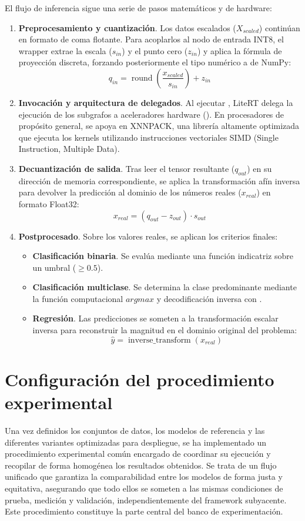 \documentclass[a4paper,12pt,twoside,final]{book}
\begin{document}
El flujo de inferencia sigue una serie de pasos matemáticos y de hardware:
\begin{enumerate}
  \item \textbf{Preprocesamiento y cuantización}. Los datos escalados ($X_{scaled}$) continúan en formato de coma
  flotante. Para acoplarlos al nodo de entrada INT8, el wrapper extrae la escala ($s_{in}$) y el punto cero ($z_{in}$)
  y aplica la fórmula de proyección discreta, forzando posteriormente el tipo numérico a  de NumPy:
  \[
  q_{in} = \operatorname{round}\left(\frac{x_{scaled}}{s_{in}}\right) + z_{in}
  \]
  \item \textbf{Invocación y arquitectura de delegados}. Al ejecutar , LiteRT delega la ejecución de los
  subgrafos a aceleradores hardware (). En procesadores de propósito general, se apoya en XNNPACK, una
  librería altamente optimizada que ejecuta los kernels utilizando instrucciones vectoriales SIMD
  (Single Instruction, Multiple Data).
  \item \textbf{Decuantización de salida}. Tras leer el tensor resultante ($q_{out}$) en su dirección de memoria
  correspondiente, se aplica la transformación afín inversa para devolver la predicción al dominio de los números
  reales ($x_{real}$) en formato Float32:
  \[
  x_{real} = (q_{out} - z_{out}) \cdot s_{out}
  \]
  \item \textbf{Postprocesado}. Sobre los valores reales, se aplican los criterios finales:
  \begin{itemize}
    \item \textbf{Clasificación binaria}. Se evalúa mediante una función indicatriz sobre un umbral ($\ge 0.5$).
    \item \textbf{Clasificación multiclase}. Se determina la clase predominante mediante la función computacional
    $argmax$ y decodificación inversa con .
    \item \textbf{Regresión}. Las predicciones se someten a la transformación escalar inversa para reconstruir la
    magnitud en el dominio original del problema:
    \[
    \hat{y} = \operatorname{inverse\_transform}(x_{real})
    \]
  \end{itemize}
\end{enumerate}

\section{Configuración del procedimiento experimental}
Una vez definidos los conjuntos de datos, los modelos de referencia y las diferentes variantes optimizadas para
despliegue, se ha implementado un procedimiento experimental común encargado de coordinar su ejecución y recopilar de
forma homogénea los resultados obtenidos. Se trata de un flujo unificado que garantiza la comparabilidad entre los
modelos de forma justa y equitativa, asegurando que todo ellos se someten a las mismas condiciones de prueba, medición
y validación, independientemente del framework subyacente. Este procedimiento constituye la parte central del banco de
experimentación.\\
\end{document}
